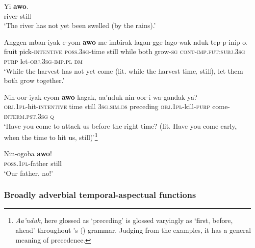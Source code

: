 \begin{exe}
	\ex\label{exAppendixWesternDaniNotYet1}
	\gll Yi \textbf{awo}.\\
	river still\\
	\glt \lq The river has not yet been swelled (by the rains).' \parencite[440]{Barclay2008}

	\ex\label{exAppendixWesternDaniNotYet2}
	\gll Anggen mban-iyak e-yom \textbf{awo}	 me imbirak lagan-gge lago-wak nduk tep-p-inip o.\\
fruit pick-\textsc{intentive} \textsc{poss}.3\textsc{sg}-time still while both grow-\textsc{sg} \textsc{cont}-\textsc{imp.fut}:\textsc{subj}.3\textsc{sg} \textsc{purp} let-\textsc{obj}.3\textsc{sg}-\textsc{imp.pl} \textsc{dm}\\
	\glt \lq While the harvest has not yet come (lit. while the harvest time, still), let them both grow together.'  \parencite[441]{Barclay2008}

	\ex\label{exAppendixWesternDaniNotYet3}
	\gll Nin-oor-iyak eyom \textbf{awo} kagak, aa’nduk nin-oor-i wa-gandak ya?\\
\textsc{obj}.1\textsc{pl}-hit-\textsc{intentive} time still 3\textsc{sg}.\textsc{sim}.\textsc{ds} preceding \textsc{obj}.1\textsc{pl}-kill-\textsc{purp} come-\textsc{interm}.\textsc{pst}.3\textsc{sg} \textsc{q}\\
	\glt \lq Have you come to attack us before the right time? (lit. Have you come early, when the time to hit us, still)'\footnote{\textit{Aa’nduk}, here glossed as \lq preceding' is glossed varyingly as \lq first, before, ahead' throughout \citeauthor{Barclay2008}'s (\citeyear{Barclay2008}) grammar. Judging from the examples, it has a general meaning of precedence.} \parencite[475]{Barclay2008}

	\ex\label{exAppendixWesternDaniNotYet4}
	\gll Nin-ogoba \textbf{awo}!\\
	\textsc{poss}.1\textsc{pl}-father still\\
	\glt \lq Our father, no!' \parencite[441]{Barclay2008}
\end{exe}
\largerpage
\subsubsection{Broadly adverbial temporal-aspectual functions}
